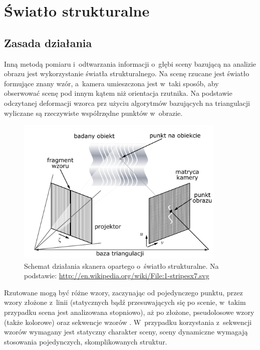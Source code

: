 \section{Światło strukturalne}

\subsection{Zasada działania}

Inną metodą pomiaru i~odtwarzania informacji o~głębi sceny bazującą na analizie
obrazu jest wykorzystanie światła strukturalnego. Na scenę rzucane jest światło
formujące znany wzór, a~kamera umieszczona jest w~taki sposób, aby obserwować
scenę pod innym kątem niż orientacja rzutnika. Na podstawie odczytanej deformacji
wzorca prz użyciu algorytmów bazujących na triangulacji wyliczane są rzeczywiste
współrzędne punktów w~obrazie.

\begin{figure}[htb!]
\centering
\includegraphics[width=10cm]{../../Common/img/struct}
\caption[Schemat działania skanera opartego o~światło strukturalne]
{Schemat działania skanera opartego o~światło strukturalne. Na podstawie:
\url{http://en.wikipedia.org/wiki/File:1-stripesx7.svg}}
\label{fig:struct_principle}
\end{figure}

Rzutowane mogą być różne wzory, zaczynając od pojedynczego punktu, przez
wzory złożone z~linii (statycznych bądź przesuwających się po
scenie, w~takim przypadku scena jest analizowana stopniowo), aż po złożone,
pseudolosowe wzory (także kolorowe) oraz sekwencje wzorów \cite{1588327}. 
W~przypadku korzystania z~sekwencji wzorów wymagany jest statyczny charakter
sceny, sceny dynamiczne wymagają stosowania pojedynczych, skomplikowanych
struktur.

